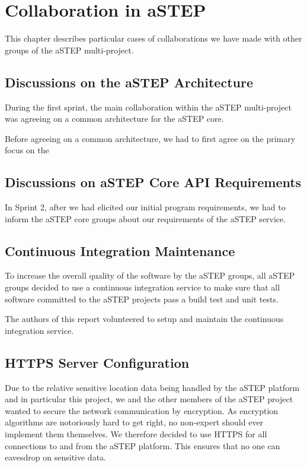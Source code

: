 \chapter{Collaboration in aSTEP}\label{ch:collab}

This chapter describes particular cases of collaborations we have made with other groups of the aSTEP multi-project.

\section{Discussions on the aSTEP Architecture}
During the first sprint, the main collaboration within the aSTEP multi-project was agreeing on a common architecture for the aSTEP core.

Before agreeing on a common architecture, we had to first agree on the primary focus on the 

\section{Discussions on aSTEP Core API Requirements}
In Sprint 2, after we had elicited our initial program requirements, we had to inform the aSTEP core groups about our requirements of the aSTEP service.

\section{Continuous Integration Maintenance}
To increase the overall quality of the software by the aSTEP groups, all aSTEP groups decided to use a continuous integration service to make sure that all software committed to the aSTEP projects pass a build test and unit tests.

The authors of this report volunteered to setup and maintain the continuous integration service.

\section{HTTPS Server Configuration}
Due to the relative sensitive location data being handled by the aSTEP platform and in particular this project, we and the other members of the aSTEP project wanted to secure the network communication by encryption. As encryption algorithms are notoriously hard to get right, no non-expert should ever implement them themselves. We therefore decided to use HTTPS for all connections to and from the aSTEP platform. This ensures that no one can eavesdrop on sensitive data.

